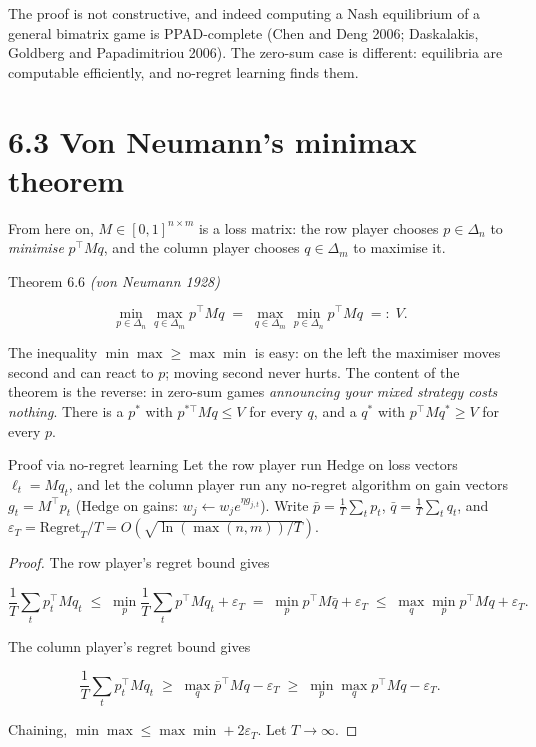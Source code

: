 \documentclass[11pt,a4paper,openany]{book}
\newcommand{\eps}{\varepsilon}
\newcommand{\Reg}{\mathrm{Regret}}
\newcommand{\simplex}{\Delta}
\begin{document}
The proof is not constructive, and indeed computing a Nash equilibrium of a general bimatrix game is PPAD-complete (Chen and Deng 2006; Daskalakis, Goldberg and Papadimitriou 2006). The zero-sum case is different: equilibria are computable efficiently, and no-regret learning finds them.

\section*{6.3 Von Neumann's minimax theorem}\label{ch6-minimax}

From here on, $M\in[0,1]^{n\times m}$ is a loss matrix: the row player chooses $p\in\simplex_n$ to \emph{minimise} $p^\top Mq$, and the column player chooses $q\in\simplex_m$ to maximise it.

\begin{bthm}{Theorem 6.6 \emph{(von Neumann 1928)}}

\[\min_{p\in\simplex_n}\max_{q\in\simplex_m}p^\top Mq\;=\;\max_{q\in\simplex_m}\min_{p\in\simplex_n}p^\top Mq\;=:\;V.\]

\end{bthm}

The inequality $\min\max\ge\max\min$ is easy: on the left the maximiser moves second and can react to $p$; moving second never hurts. The content of the theorem is the reverse: in zero-sum games \emph{announcing your mixed strategy costs nothing}. There is a $p^*$ with $p^{*\top}Mq\le V$ for every $q$, and a $q^*$ with $p^\top Mq^*\ge V$ for every $p$.

\begin{bthm}{Proof via no-regret learning}
Let the row player run Hedge on loss vectors $\ell_t=Mq_t$, and let the column player run any no-regret algorithm on gain vectors $g_t=M^\top p_t$ (Hedge on gains: $w_{j}\leftarrow w_je^{\eta g_{j,t}}$). Write $\bar p=\frac1T\sum_tp_t$, $\bar q=\frac1T\sum_tq_t$, and $\eps_T=\Reg_T/T=O(\sqrt{\ln(\max(n,m))/T})$.
\end{bthm}

\begin{proof}
The row player's regret bound gives

\[\frac1T\sum_tp_t^\top Mq_t\;\le\;\min_p\frac1T\sum_tp^\top Mq_t+\eps_T\;=\;\min_pp^\top M\bar q+\eps_T\;\le\;\max_q\min_pp^\top Mq+\eps_T.\]

The column player's regret bound gives

\[\frac1T\sum_tp_t^\top Mq_t\;\ge\;\max_q\bar p^\top Mq-\eps_T\;\ge\;\min_p\max_qp^\top Mq-\eps_T.\]

Chaining, $\min\max\le\max\min+2\eps_T$. Let $T\to\infty$.
\end{proof}
\end{document}
